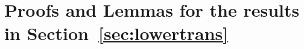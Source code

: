\documentclass[10pt,a4paper]{paper}
\theoremstyle{definition}
\newtheorem{corollary}[theorem]{Corollary}
\newcommand{\reals}{\mathbb{R}}
\newcommand{\realsnonneg}{\reals_{\geq 0}}
\newcommand{\rateset}{\mathcal{Q}}
\begin{document}



\section{Proofs and Lemmas for the results in Section~\ref{sec:lowertrans}}
\end{document}
